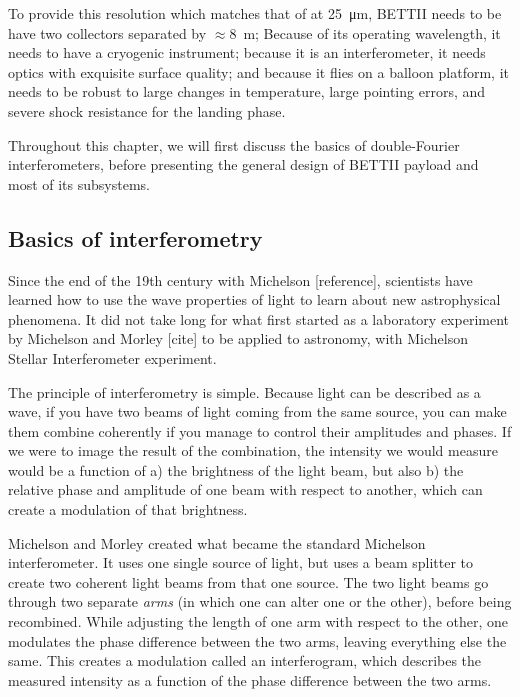 To provide this resolution which matches that of \JWST at \SI{25}{\micro\meter}, BETTII needs to be have two collectors separated by $\approx$\SI{8}{\meter}; Because of its operating wavelength, it needs to have a cryogenic instrument; because it is an interferometer, it needs optics with exquisite surface quality; and because it flies on a balloon platform, it needs to be robust to large changes in temperature, large pointing errors, and severe shock resistance for the landing phase.

Throughout this chapter, we will first discuss the basics of double-Fourier interferometers, before presenting the general design of BETTII payload and most of its subsystems.


\subsection{Basics of interferometry}

Since the end of the 19th century with Michelson [reference], scientists have learned how to use the wave properties of light to learn about new astrophysical phenomena. It did not take long for what first started as a laboratory experiment by Michelson and Morley [cite] to be applied to astronomy, with Michelson Stellar Interferometer experiment. 

The principle of interferometry is simple. Because light can be described as a wave, if you have two beams of light coming from the same source, you can make them combine coherently if you manage to control their amplitudes and phases. If we were to image the result of the combination, the intensity we would measure would be a function of a) the brightness of the light beam, but also b) the relative phase and amplitude of one beam with respect to another, which can create a modulation of that brightness.

Michelson and Morley created what became the standard Michelson interferometer. It uses one single source of light, but uses a beam splitter to create two coherent light beams from that one source. The two light beams go through two separate \textit{arms} (in which one can alter one or the other), before being recombined. While adjusting the length of one arm with respect to the other, one modulates the phase difference between the two arms, leaving everything else the same. This creates a modulation called an interferogram, which describes the measured intensity as a function of the phase difference between the two arms.

